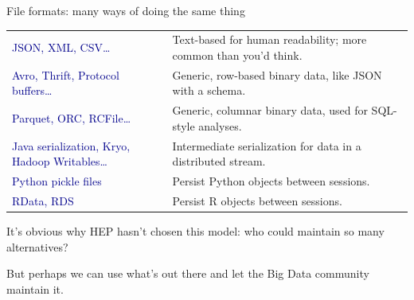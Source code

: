 \documentclass{beamer}
\begin{document}
\begin{frame}{File formats: many ways of doing the same thing}

\vfill
\hspace{-0.4 cm}\begin{minipage}{\linewidth}
\renewcommand{\arraystretch}{1.5}
\begin{tabular}{p{0.4\linewidth} p{0.6\linewidth}}
\textcolor{darkblue}{JSON, XML, CSV\ldots} & Text-based for human readability; more common than you'd think. \\
\raggedright \textcolor{darkblue}{Avro, Thrift, Protocol buffers\ldots} & Generic, row-based binary data, like JSON with a schema. \\
\textcolor{darkblue}{Parquet, ORC, RCFile\ldots} & Generic, columnar binary data, used for SQL-style analyses. \\
\raggedright \textcolor{darkblue}{Java serialization, Kryo, Hadoop Writables\ldots} & Intermediate serialization for data in a distributed stream. \\
\textcolor{darkblue}{Python pickle files} & Persist Python objects between sessions. \\
\textcolor{darkblue}{RData, RDS} & Persist R objects between sessions. \\
\end{tabular}
\end{minipage}
\vfill
\end{frame}

\begin{frame}{}
\begin{center}
\begin{minipage}{0.8\linewidth}
It's obvious why HEP hasn't chosen this model: who could maintain so many alternatives?

\vspace{1.8 cm}
But perhaps we can use what's out there and let the Big Data community maintain it.
\end{minipage}
\end{center}
\end{frame}
\end{document}
